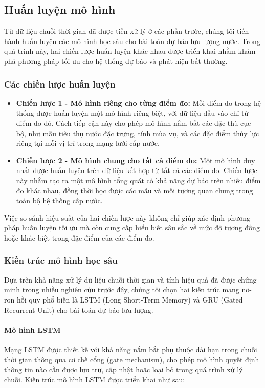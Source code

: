 \subsection{Huấn luyện mô hình}

Từ dữ liệu chuỗi thời gian đã được tiền xử lý ở các phần trước, chúng tôi tiến hành huấn luyện các mô hình học sâu cho bài toán dự báo lưu lượng nước. Trong quá trình này, hai chiến lược huấn luyện khác nhau được triển khai nhằm khám phá phương pháp tối ưu cho hệ thống dự báo và phát hiện bất thường.

\subsubsection{Các chiến lược huấn luyện}

\begin{itemize}
    \item \textbf{Chiến lược 1 - Mô hình riêng cho từng điểm đo:} Mỗi điểm đo trong hệ thống được huấn luyện một mô hình riêng biệt, với dữ liệu đầu vào chỉ từ điểm đo đó. Cách tiếp cận này cho phép mô hình nắm bắt các đặc thù cục bộ, như mẫu tiêu thụ nước đặc trưng, tính mùa vụ, và các đặc điểm thủy lực riêng tại mỗi vị trí trong mạng lưới cấp nước.
    
    \item \textbf{Chiến lược 2 - Mô hình chung cho tất cả điểm đo:} Một mô hình duy nhất được huấn luyện trên dữ liệu kết hợp từ tất cả các điểm đo. Chiến lược này nhằm tạo ra một mô hình tổng quát có khả năng dự báo trên nhiều điểm đo khác nhau, đồng thời học được các mẫu và mối tương quan chung trong toàn bộ hệ thống cấp nước.
\end{itemize}

Việc so sánh hiệu suất của hai chiến lược này không chỉ giúp xác định phương pháp huấn luyện tối ưu mà còn cung cấp hiểu biết sâu sắc về mức độ tương đồng hoặc khác biệt trong đặc điểm của các điểm đo.

\subsubsection{Kiến trúc mô hình học sâu}

Dựa trên khả năng xử lý dữ liệu chuỗi thời gian và tính hiệu quả đã được chứng minh trong nhiều nghiên cứu trước đây, chúng tôi chọn hai kiến trúc mạng nơ-ron hồi quy phổ biến là LSTM (Long Short-Term Memory) và GRU (Gated Recurrent Unit) cho bài toán dự báo lưu lượng.

\paragraph{Mô hình LSTM}
Mạng LSTM được thiết kế với khả năng nắm bắt phụ thuộc dài hạn trong chuỗi thời gian thông qua cơ chế cổng (gate mechanism), cho phép mô hình quyết định thông tin nào cần được lưu trữ, cập nhật hoặc loại bỏ trong quá trình xử lý chuỗi. Kiến trúc mô hình LSTM được triển khai như sau:

